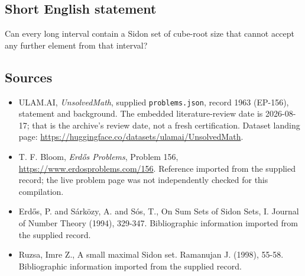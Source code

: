 \documentclass[11pt,a4paper]{article}
\begin{document}
\subsection{Short English statement}

Can every long interval contain a Sidon set of cube-root size that cannot accept any further element from that interval?

\subsection{Sources}

{\small

\begin{itemize}

\item[\hypertarget{source:1963:1}{S1}] ULAM.AI, \emph{UnsolvedMath}, supplied \texttt{problems.json}, record 1963 (EP-156), statement and background. The embedded literature-review date is 2026-08-17; that is the archive’s review date, not a fresh certification. Dataset landing page: \url{https://huggingface.co/datasets/ulamai/UnsolvedMath}.

\item[\hypertarget{source:1963:2}{S2}] T. F. Bloom, \emph{Erdős Problems}, Problem 156, \url{https://www.erdosproblems.com/156}. Reference imported from the supplied record; the live problem page was not independently checked for this compilation.

\item[\hypertarget{source:1963:3}{S3}] Erd\H{o}s, P. and S\'{a}rk\"{o}zy, A. and S\'{o}s, T., On Sum Sets of Sidon Sets, I. Journal of Number Theory (1994), 329-347. Bibliographic information imported from the supplied record.

\item[\hypertarget{source:1963:4}{S4}] Ruzsa, Imre Z., A small maximal Sidon set. Ramanujan J. (1998), 55-58. Bibliographic information imported from the supplied record.

\end{itemize}

}

\label{end:1963}
\end{document}
